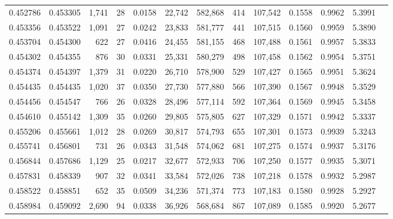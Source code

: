 \begin{tabular}{rrrrrrrrrrrrr}
0.452786 & 0.453305 & 1,741 &    28 &                                     0.0158 &  22,742 & 582,868 &     414 & 107,542 & 0.1558 & 0.9962 & 5.3991 \\
0.453356 & 0.453522 & 1,091 &    27 &                                     0.0242 &  23,833 & 581,777 &     441 & 107,515 & 0.1560 & 0.9959 & 5.3890 \\
0.453704 & 0.454300 &   622 &    27 &                                     0.0416 &  24,455 & 581,155 &     468 & 107,488 & 0.1561 & 0.9957 & 5.3833 \\
0.454302 & 0.454355 &   876 &    30 &                                     0.0331 &  25,331 & 580,279 &     498 & 107,458 & 0.1562 & 0.9954 & 5.3751 \\
0.454374 & 0.454397 & 1,379 &    31 &                                     0.0220 &  26,710 & 578,900 &     529 & 107,427 & 0.1565 & 0.9951 & 5.3624 \\
0.454435 & 0.454435 & 1,020 &    37 &                                     0.0350 &  27,730 & 577,880 &     566 & 107,390 & 0.1567 & 0.9948 & 5.3529 \\
0.454456 & 0.454547 &   766 &    26 &                                     0.0328 &  28,496 & 577,114 &     592 & 107,364 & 0.1569 & 0.9945 & 5.3458 \\
0.454610 & 0.455142 & 1,309 &    35 &                                     0.0260 &  29,805 & 575,805 &     627 & 107,329 & 0.1571 & 0.9942 & 5.3337 \\
0.455206 & 0.455661 & 1,012 &    28 &                                     0.0269 &  30,817 & 574,793 &     655 & 107,301 & 0.1573 & 0.9939 & 5.3243 \\
0.455741 & 0.456801 &   731 &    26 &                                     0.0343 &  31,548 & 574,062 &     681 & 107,275 & 0.1574 & 0.9937 & 5.3176 \\
0.456844 & 0.457686 & 1,129 &    25 &                                     0.0217 &  32,677 & 572,933 &     706 & 107,250 & 0.1577 & 0.9935 & 5.3071 \\
0.457831 & 0.458339 &   907 &    32 &                                     0.0341 &  33,584 & 572,026 &     738 & 107,218 & 0.1578 & 0.9932 & 5.2987 \\
0.458522 & 0.458851 &   652 &    35 &                                     0.0509 &  34,236 & 571,374 &     773 & 107,183 & 0.1580 & 0.9928 & 5.2927 \\
0.458984 & 0.459092 & 2,690 &    94 &                                     0.0338 &  36,926 & 568,684 &     867 & 107,089 & 0.1585 & 0.9920 & 5.2677 \\

\end{tabular}
